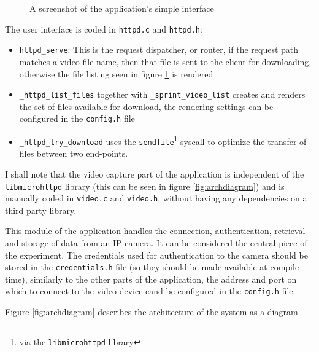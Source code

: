 \documentclass[10pt,a4paper,twoside]{article}
\begin{document}
\begin{figure}
  \centering
  \caption{A screenshot of the application's simple interface}
  \label{fig:interface}
\end{figure}

The user interface is coded in \texttt{httpd.c} and \texttt{httpd.h}:

\begin{itemize}
\item \texttt{httpd\_serve}: This is the request dispatcher, or router, if the request path matches a video file name,
then that file is sent to the client for downloading, otherwise the file listing seen in figure \ref{fig:interface} is rendered
\item \texttt{\_httpd\_list\_files} together with \texttt{\_sprint\_video\_list} creates and renders
the set of files available for download, the rendering settings can be configured in the \texttt{config.h} file
\item \texttt{\_httpd\_try\_download} uses the \texttt{sendfile}\footnote{via the \texttt{libmicrohttpd} library}
syscall to optimize the transfer of files between two end-points.
\end{itemize}

I shall note that the video capture part of the application is independent of the \texttt{libmicrohttpd}
library (this can be seen in figure \ref{fig:archdiagram}) and is manually coded in
\texttt{video.c} and \texttt{video.h},
without having any dependencies on a third party library.

This module of the application handles the connection, authentication, retrieval and storage of data
from an IP camera.
 It can be considered the central piece of the experiment.
 The credentials used for authentication to the camera should be stored in the \texttt{credentials.h}
 file (so they should be made available at compile time), similarly to the other parts of the application,
 the address and port on which to connect to the video device cand be configured in the \texttt{config.h} file.

Figure \ref{fig:archdiagram} describes the architecture of the system as a diagram.
\end{document}
